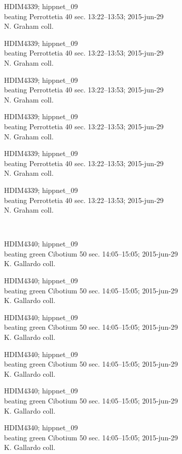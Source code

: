 \documentclass[2pt]{extarticle}
\begin{document}
\noindent
\parbox{0.16\textwidth}{\tiny \raggedright \rule[-0.3\baselineskip]{0pt}{10pt}HDIM4339; hippnet\_09\\ beating Perrottetia 40 sec. 13:22--13:53; 2015-jun-29\\ N. Graham coll.}
\parbox{0.16\textwidth}{\tiny \raggedright \rule[-0.3\baselineskip]{0pt}{10pt}HDIM4339; hippnet\_09\\ beating Perrottetia 40 sec. 13:22--13:53; 2015-jun-29\\ N. Graham coll.}
\parbox{0.16\textwidth}{\tiny \raggedright \rule[-0.3\baselineskip]{0pt}{10pt}HDIM4339; hippnet\_09\\ beating Perrottetia 40 sec. 13:22--13:53; 2015-jun-29\\ N. Graham coll.}
\parbox{0.16\textwidth}{\tiny \raggedright \rule[-0.3\baselineskip]{0pt}{10pt}HDIM4339; hippnet\_09\\ beating Perrottetia 40 sec. 13:22--13:53; 2015-jun-29\\ N. Graham coll.}
\parbox{0.16\textwidth}{\tiny \raggedright \rule[-0.3\baselineskip]{0pt}{10pt}HDIM4339; hippnet\_09\\ beating Perrottetia 40 sec. 13:22--13:53; 2015-jun-29\\ N. Graham coll.}
\parbox{0.16\textwidth}{\tiny \raggedright \rule[-0.3\baselineskip]{0pt}{10pt}HDIM4339; hippnet\_09\\ beating Perrottetia 40 sec. 13:22--13:53; 2015-jun-29\\ N. Graham coll.} \\ 
\vspace{0.001in} 

\noindent
\parbox{0.16\textwidth}{\tiny \raggedright \rule[-0.3\baselineskip]{0pt}{10pt}HDIM4340; hippnet\_09\\ beating green Cibotium 50 sec. 14:05--15:05; 2015-jun-29\\ K. Gallardo coll.}
\parbox{0.16\textwidth}{\tiny \raggedright \rule[-0.3\baselineskip]{0pt}{10pt}HDIM4340; hippnet\_09\\ beating green Cibotium 50 sec. 14:05--15:05; 2015-jun-29\\ K. Gallardo coll.}
\parbox{0.16\textwidth}{\tiny \raggedright \rule[-0.3\baselineskip]{0pt}{10pt}HDIM4340; hippnet\_09\\ beating green Cibotium 50 sec. 14:05--15:05; 2015-jun-29\\ K. Gallardo coll.}
\parbox{0.16\textwidth}{\tiny \raggedright \rule[-0.3\baselineskip]{0pt}{10pt}HDIM4340; hippnet\_09\\ beating green Cibotium 50 sec. 14:05--15:05; 2015-jun-29\\ K. Gallardo coll.}
\parbox{0.16\textwidth}{\tiny \raggedright \rule[-0.3\baselineskip]{0pt}{10pt}HDIM4340; hippnet\_09\\ beating green Cibotium 50 sec. 14:05--15:05; 2015-jun-29\\ K. Gallardo coll.}
\parbox{0.16\textwidth}{\tiny \raggedright \rule[-0.3\baselineskip]{0pt}{10pt}HDIM4340; hippnet\_09\\ beating green Cibotium 50 sec. 14:05--15:05; 2015-jun-29\\ K. Gallardo coll.} \\ 
\vspace{0.001in} 
\end{document}
